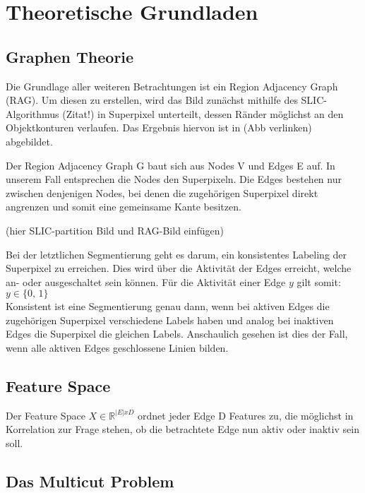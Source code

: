 \chapter{Theoretische Grundladen}\label{ch:theoretischeGrundlagen}
\section{Graphen Theorie}\label{sec:graphTheory}

Die Grundlage aller weiteren Betrachtungen ist ein Region Adjacency Graph (RAG). Um diesen zu erstellen, wird das Bild zunächst mithilfe des SLIC-Algorithmus (Zitat!) in Superpixel unterteilt, dessen Ränder möglichst an den Objektkonturen verlaufen. Das Ergebnis hiervon ist in (Abb verlinken) abgebildet. 

Der Region Adjacency Graph G baut sich aus Nodes V und Edges E auf. In unserem Fall entsprechen die Nodes den Superpixeln. Die Edges bestehen nur zwischen denjenigen Nodes, bei denen die zugehörigen Superpixel direkt angrenzen und somit eine gemeinsame Kante besitzen. 

(hier SLIC-partition Bild und RAG-Bild einfügen)




Bei der letztlichen Segmentierung geht es darum, ein konsistentes Labeling der Superpixel zu erreichen. Dies wird über die Aktivität der Edges erreicht, welche an- oder ausgeschaltet sein können. Für die Aktivität einer Edge $y$ gilt somit: $y \in \{\text{0, 1}\}$ \\
Konsistent ist eine Segmentierung genau dann, wenn bei aktiven Edges die zugehörigen Superpixel verschiedene Labels haben und analog bei inaktiven Edges die Superpixel die gleichen Labels. Anschaulich gesehen ist dies der Fall, wenn alle aktiven Edges geschlossene Linien bilden.


\section{Feature Space}\label{sec:featureSpace}

Der Feature Space $X \in \mathbb{R}^{|E|xD}$ ordnet jeder Edge D Features zu, die möglichst in Korrelation zur Frage stehen, ob die betrachtete Edge nun aktiv oder inaktiv sein soll. 



\section{Das Multicut Problem}\label{sec:multicutProb}

